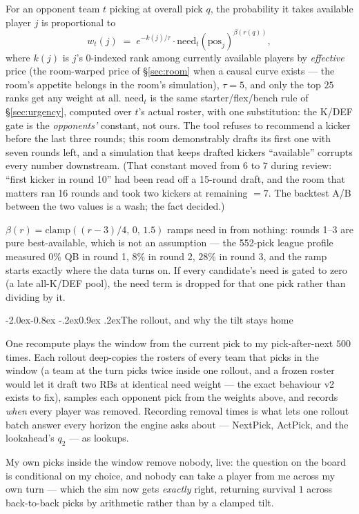\documentclass[10pt,a4paper]{article}
\makeatletter
\theoremstyle{plain}
\theoremstyle{definition}
\theoremstyle{remark}
\renewcommand\subsection{\@startsection{subsection}{2}{\z@}%
  {-2.0ex\@plus -0.8ex \@minus -.2ex}{0.9ex \@plus .2ex}{\normalfont\large\bfseries}}
\makeatother
\begin{document}
For an opponent team $t$ picking at overall pick $q$, the probability it takes available
player $j$ is proportional to
\[
  w_t(j) \;=\; e^{-k(j)/\tau} \cdot \mathrm{need}_t(\mathrm{pos}_j)^{\beta(r(q))},
\]
where $k(j)$ is $j$'s 0-indexed rank among currently available players by \emph{effective}
price (the room-warped price of \S\ref{sec:room} when a causal curve exists --- the room's
appetite belongs in the room's simulation), $\tau = 5$, and only the top $25$ ranks get any
weight at all. $\mathrm{need}_t$ is the same starter/flex/bench rule of \S\ref{sec:urgency},
computed over $t$'s actual roster, with one substitution: the K/DEF gate is the
\emph{opponents'} constant, not ours. The tool refuses to recommend a kicker before the
last three rounds; this room demonstrably drafts its first one with seven rounds left, and
a simulation that keeps drafted kickers ``available'' corrupts every number downstream.
(That constant moved from $6$ to $7$ during review: ``first kicker in round 10'' had been
read off a 15-round draft, and the room that matters ran 16 rounds and took two kickers at
remaining $= 7$. The backtest A/B between the two values is a wash; the fact decided.)

$\beta(r) = \mathrm{clamp}((r-3)/4,\,0,\,1.5)$ ramps need in from nothing: rounds 1--3 are
pure best-available, which is not an assumption --- the 552-pick league profile measured
$0\%$ QB in round 1, $8\%$ in round 2, $28\%$ in round 3, and the ramp starts exactly where
the data turns on. If every candidate's need is gated to zero (a late all-K/DEF pool), the
need term is dropped for that one pick rather than dividing by it.

\subsection{The rollout, and why the tilt stays home}

One recompute plays the window from the current pick to my pick-after-next $500$ times.
Each rollout deep-copies the rosters of every team that picks in the window (a team at the
turn picks twice inside one rollout, and a frozen roster would let it draft two RBs at
identical need weight --- the exact behaviour v2 exists to fix), samples each opponent pick
from the weights above, and records \emph{when} every player was removed. Recording removal
times is what lets one rollout batch answer every horizon the engine asks about ---
NextPick, ActPick, and the lookahead's $q_2$ --- as lookups.

My own picks inside the window remove nobody, live: the question on the board is
conditional on my choice, and nobody can take a player from me across my own turn ---
which the sim now gets \emph{exactly} right, returning survival $1$ across back-to-back
picks by arithmetic rather than by a clamped tilt.
\end{document}
